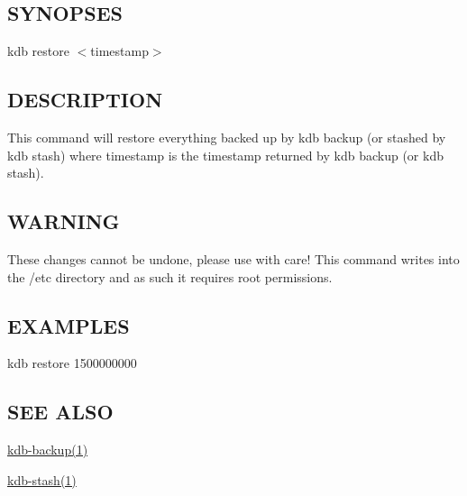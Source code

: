 \subsection*{S\+Y\+N\+O\+P\+S\+ES}

{\ttfamily kdb restore $<$timestamp$>$}

\subsection*{D\+E\+S\+C\+R\+I\+P\+T\+I\+ON}

This command will restore everything backed up by {\ttfamily kdb backup} (or stashed by {\ttfamily kdb stash}) where {\ttfamily timestamp} is the timestamp returned by {\ttfamily kdb backup} (or {\ttfamily kdb stash}).

\subsection*{W\+A\+R\+N\+I\+NG}

These changes cannot be undone, please use with care! This command writes into the {\ttfamily /etc} directory and as such it requires root permissions.

\subsection*{E\+X\+A\+M\+P\+L\+ES}


\begin{DoxyCode}
kdb restore 1500000000
\end{DoxyCode}


\subsection*{S\+EE A\+L\+SO}


\begin{DoxyItemize}
\item \hyperlink{doc_help_kdb-backup_md}{kdb-\/backup(1)}
\item \hyperlink{doc_help_kdb-stash_md}{kdb-\/stash(1)} 
\end{DoxyItemize}